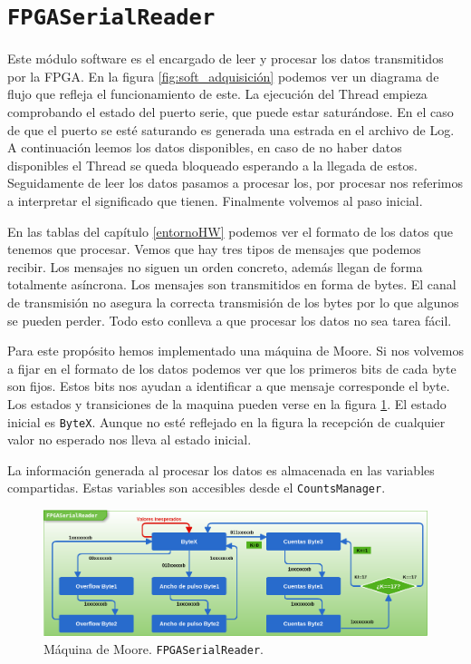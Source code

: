\section{\texttt{FPGASerialReader}}
	Este módulo software es el encargado de leer y procesar los datos transmitidos por la FPGA. En la figura \ref{fig:soft_adquisición} podemos
	ver un diagrama de flujo que refleja el funcionamiento de este. La ejecución del Thread empieza comprobando el estado del puerto serie, que
	puede estar saturándose. En el caso de que el puerto se esté saturando es generada una estrada en el archivo de Log. A continuación leemos
	los datos disponibles, en caso de no haber datos disponibles el Thread se queda bloqueado esperando a la llegada de estos. Seguidamente de
	leer los datos pasamos a procesar los, por procesar nos referimos a interpretar el significado que tienen. Finalmente volvemos al paso inicial.  
	\par
	En las tablas del capítulo \ref{entornoHW} podemos ver el formato de los datos que tenemos que procesar. Vemos que hay tres tipos de mensajes
	que podemos recibir. Los mensajes no siguen un orden concreto, además llegan de forma totalmente asíncrona. Los mensajes son transmitidos en
	forma de bytes. El canal de transmisión no asegura la correcta transmisión de los bytes por lo que algunos se pueden perder. Todo esto
	conlleva a que procesar los datos no sea tarea fácil.
	\par
	Para este propósito hemos implementado una máquina de Moore. Si nos volvemos a fijar en el formato de los datos podemos ver que los primeros
	bits de cada byte son fijos. Estos bits nos ayudan a identificar a que mensaje corresponde el byte. Los estados y transiciones de la maquina
	pueden verse en la figura \ref{fig:reader}. El estado inicial es \texttt{ByteX}. Aunque no esté reflejado en la figura la recepción de cualquier
	valor no esperado nos lleva al estado inicial.
	\par
	La información generada al procesar los datos es almacenada en las variables compartidas. Estas variables son accesibles desde el 
	\texttt{CountsManager}.
	\begin{figure}[h]
		\centering
		\includegraphics[keepaspectratio, width=1\textwidth]{./img/reader.png}
		\caption{Máquina de Moore. \texttt{FPGASerialReader}.}   
		\label{fig:reader}
	\end{figure}

